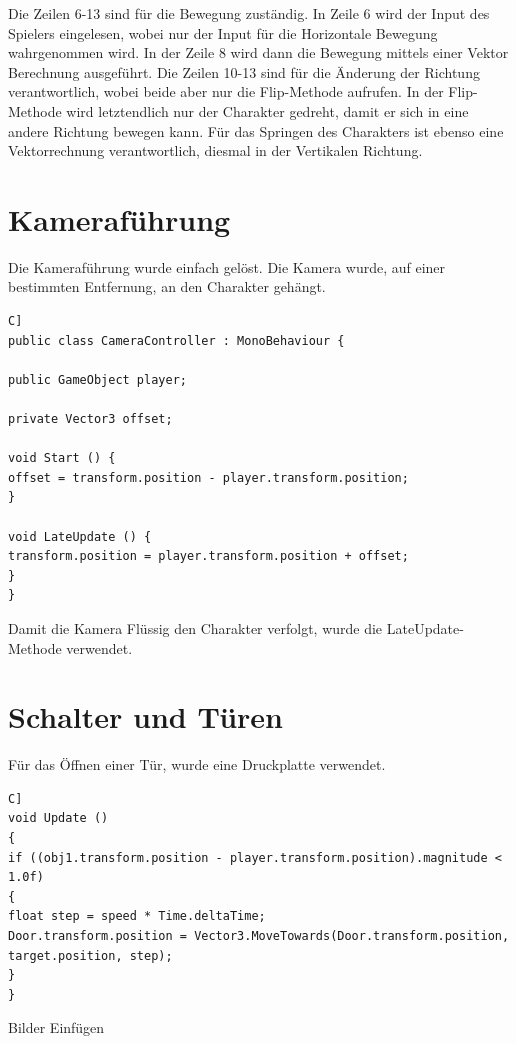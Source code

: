 Die Zeilen 6-13  sind für die Bewegung zuständig. In Zeile 6 wird der Input des Spielers eingelesen, wobei nur der Input für die Horizontale Bewegung wahrgenommen wird.
In der Zeile 8 wird dann die Bewegung mittels einer Vektor Berechnung ausgeführt.
Die Zeilen 10-13 sind für die Änderung der Richtung verantwortlich, wobei beide aber nur die Flip-Methode aufrufen. In der Flip-Methode wird letztendlich nur der Charakter gedreht, damit er sich in eine andere Richtung bewegen kann.
Für das Springen des Charakters ist ebenso eine Vektorrechnung verantwortlich, diesmal in der Vertikalen Richtung.

\section{Kameraführung}
Die Kameraführung wurde einfach gelöst. Die Kamera wurde, auf einer bestimmten Entfernung, an den Charakter gehängt. 

\begin{lstlisting}[language=[Sharp]C]
public class CameraController : MonoBehaviour {

public GameObject player;

private Vector3 offset;

void Start () {
offset = transform.position - player.transform.position;
}

void LateUpdate () {
transform.position = player.transform.position + offset;
}
}
\end{lstlisting}
Damit die Kamera Flüssig den Charakter verfolgt, wurde die LateUpdate-Methode verwendet.

\section{Schalter und Türen}
Für das Öffnen einer Tür, wurde eine Druckplatte verwendet. 
\begin{lstlisting}[language=[Sharp]C]
void Update ()
{
if ((obj1.transform.position - player.transform.position).magnitude < 1.0f)
{
float step = speed * Time.deltaTime;
Door.transform.position = Vector3.MoveTowards(Door.transform.position, target.position, step);
}
}
\end{lstlisting}

Bilder Einfügen

